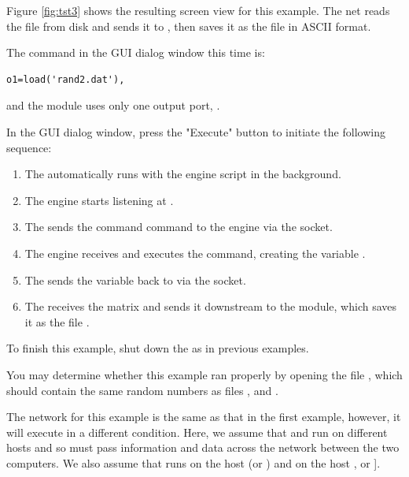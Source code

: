 Figure \ref{fig:tst3} shows the resulting screen view for this example. The
net reads the \m{} file  from disk and sends it to
\sr{}, then saves it as the  file in \sr{} ASCII
format.

The command in the \mlm{} GUI dialog window this time is:
%
\begin{verbatim}
o1=load('rand2.dat'),
\end{verbatim}
and the module uses only one output port, . 

In the \mlm{} GUI dialog window, press the "Execute" button to initiate the
following sequence:
%
\begin{enumerate}
  \item The \mlm{} automatically runs \m{} with the engine script in 
        the background. 
  \item The engine starts listening at .
  \item The \mlm{} sends the command  
        command
        to the engine via the socket.   
  \item The engine receives and executes the command, creating the 
        variable
        .
  \item The \mlm{} sends the variable  back to \sr{} 
        via the
        socket. 
  \item The \mlm{} receives the matrix and sends it
        downstream to the  module, which saves
        it as the \sr{} file .
\end{enumerate}

To finish this example, shut down the \mlm{} as in previous 
examples.

You may determine whether this example ran properly by opening the file
, which should contain the same random numbers as files
, and .


The network for this example is the same as that in the first example,
however, it will execute in a different condition. Here, we assume that \m{}
and \sr{} run on different hosts and so must pass information and data
across the network between the two computers.  We also assume that \m{}
runs on the host  (or ) and \sr{} on
the host , or ].

